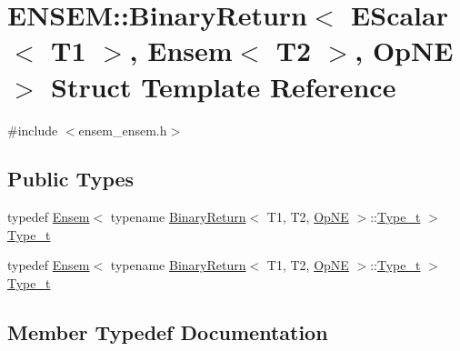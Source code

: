 \hypertarget{structENSEM_1_1BinaryReturn_3_01EScalar_3_01T1_01_4_00_01Ensem_3_01T2_01_4_00_01OpNE_01_4}{}\section{E\+N\+S\+EM\+:\+:Binary\+Return$<$ E\+Scalar$<$ T1 $>$, Ensem$<$ T2 $>$, Op\+NE $>$ Struct Template Reference}
\label{structENSEM_1_1BinaryReturn_3_01EScalar_3_01T1_01_4_00_01Ensem_3_01T2_01_4_00_01OpNE_01_4}


{\ttfamily \#include $<$ensem\+\_\+ensem.\+h$>$}

\subsection*{Public Types}
\begin{DoxyCompactItemize}
\item 
typedef \mbox{\hyperlink{classENSEM_1_1Ensem}{Ensem}}$<$ typename \mbox{\hyperlink{structENSEM_1_1BinaryReturn}{Binary\+Return}}$<$ T1, T2, \mbox{\hyperlink{structENSEM_1_1OpNE}{Op\+NE}} $>$\+::\mbox{\hyperlink{structENSEM_1_1BinaryReturn_3_01EScalar_3_01T1_01_4_00_01Ensem_3_01T2_01_4_00_01OpNE_01_4_a8fb7ff2310962fd6cdec040f6eb7981b}{Type\+\_\+t}} $>$ \mbox{\hyperlink{structENSEM_1_1BinaryReturn_3_01EScalar_3_01T1_01_4_00_01Ensem_3_01T2_01_4_00_01OpNE_01_4_a8fb7ff2310962fd6cdec040f6eb7981b}{Type\+\_\+t}}
\item 
typedef \mbox{\hyperlink{classENSEM_1_1Ensem}{Ensem}}$<$ typename \mbox{\hyperlink{structENSEM_1_1BinaryReturn}{Binary\+Return}}$<$ T1, T2, \mbox{\hyperlink{structENSEM_1_1OpNE}{Op\+NE}} $>$\+::\mbox{\hyperlink{structENSEM_1_1BinaryReturn_3_01EScalar_3_01T1_01_4_00_01Ensem_3_01T2_01_4_00_01OpNE_01_4_a8fb7ff2310962fd6cdec040f6eb7981b}{Type\+\_\+t}} $>$ \mbox{\hyperlink{structENSEM_1_1BinaryReturn_3_01EScalar_3_01T1_01_4_00_01Ensem_3_01T2_01_4_00_01OpNE_01_4_a8fb7ff2310962fd6cdec040f6eb7981b}{Type\+\_\+t}}
\end{DoxyCompactItemize}


\subsection{Member Typedef Documentation}
\mbox{\label{structENSEM_1_1BinaryReturn_3_01EScalar_3_01T1_01_4_00_01Ensem_3_01T2_01_4_00_01OpNE_01_4_a8fb7ff2310962fd6cdec040f6eb7981b}} 
